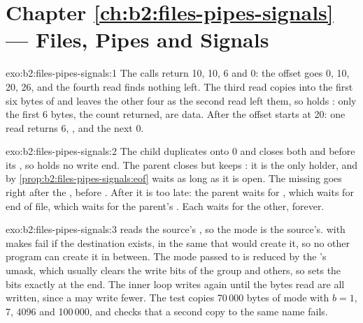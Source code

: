 \section*{Chapter \ref{ch:b2:files-pipes-signals} --- Files, Pipes and Signals}

\begin{solution}{exo:b2:files-pipes-signals:1}
The calls return 10, 10, 6 and 0: the offset goes 0, 10, 20, 26, and the fourth read finds nothing left. The third
read copies  into the first six bytes of  and leaves the other four as the second read left
them, so  holds : only the first 6 bytes, the count  returned, are data. After
 the offset starts at 20: one read returns 6, , and the next 0.
\end{solution}

\begin{solution}{exo:b2:files-pipes-signals:2}
The child duplicates  onto 0 and closes both  and  before its , so
 holds no write end. The parent closes  but keeps : it is the only holder, and by
\cref{prop:b2:files-pipes-signals:eof}  waits as long as it is open. The missing  goes
right after the , before . After  it is too late: the parent waits for
, which waits for end of file, which waits for the parent's . Each waits for the other, forever.
\end{solution}

\begin{solution}{exo:b2:files-pipes-signals:3}
 reads the source's , so the mode is the source's.  with  makes
 fail if the destination exists, in the same  that would create it, so no other program can
create it in between. The mode passed to  is reduced by the 's umask, which usually clears the
write bits of the group and others, so  sets the bits exactly at the end. The inner loop writes again
until the  bytes read are all written, since a  may write fewer. The test copies 70\,000 bytes
of mode  with $b = 1$, 7, 4096 and 100\,000, and checks that a second copy to the same name fails.
\end{solution}


